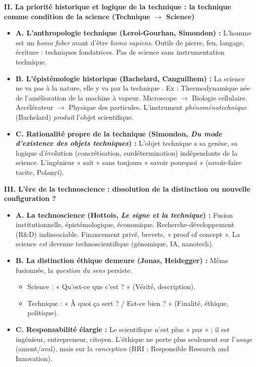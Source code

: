 \documentclass[11pt]{article}
\begin{document}
\begin{exoresolu}
    \textbf{II. La priorité historique et logique de la technique : la technique comme condition de la science (Technique $\rightarrow$ Science)}
    \begin{itemize}
        \item \textbf{A. L'anthropologie technique (Leroi-Gourhan, Simondon) :} L'homme est un \emph{homo faber} avant d'être \emph{homo sapiens}. Outils de pierre, feu, langage, écriture : techniques fondatrices. Pas de science sans instrumentation technique.
        \item \textbf{B. L'épistémologie historique (Bachelard, Canguilhem) :} \guillemotleft La science ne va pas à la nature, elle y va par la technique \guillemotright. Ex : Thermodynamique née de l'amélioration de la machine à vapeur. Microscope $\rightarrow$ Biologie cellulaire. Accélérateur $\rightarrow$ Physique des particules. L'instrument \emph{phénoménotechnique} (Bachelard) \emph{produit} l'objet scientifique.
        \item \textbf{C. Rationalité propre de la technique (Simondon, \emph{Du mode d'existence des objets techniques}) :} L'objet technique a sa genèse, sa logique d'évolution (concrétisation, surdétermination) indépendante de la science. L'ingénieur « sait » sans toujours « savoir pourquoi » (savoir-faire tacite, Polanyi).
    \end{itemize}

    \textbf{III. L'ère de la technoscience : dissolution de la distinction ou nouvelle configuration ?}
    \begin{itemize}
        \item \textbf{A. La technoscience (Hottois, \emph{Le signe et la technique}) :} Fusion institutionnelle, épistémologique, économique. Recherche-développement (R\&D) indissociable. Financement privé, brevets, « proof of concept ». La science \emph{est} devenue technoscientifique (génomique, IA, nanotech).
        \item \textbf{B. La distinction éthique demeure (Jonas, Heidegger) :} Même fusionnée, la \emph{question du sens} persiste.
        \begin{itemize}
            \item Science : « Qu'est-ce que c'est ? » (Vérité, description).
            \item Technique : « À quoi ça sert ? / Est-ce bien ? » (Finalité, éthique, politique).
        \end{itemize}
        \item \textbf{C. Responsabilité élargie :} Le scientifique n'est plus « pur » ; il est ingénieur, entrepreneur, citoyen. L'éthique ne porte plus seulement sur l'\emph{usage} (amont/aval), mais sur la \emph{conception} (RRI : Responsible Research and Innovation).
    \end{itemize}


\end{exoresolu}
\end{document}
